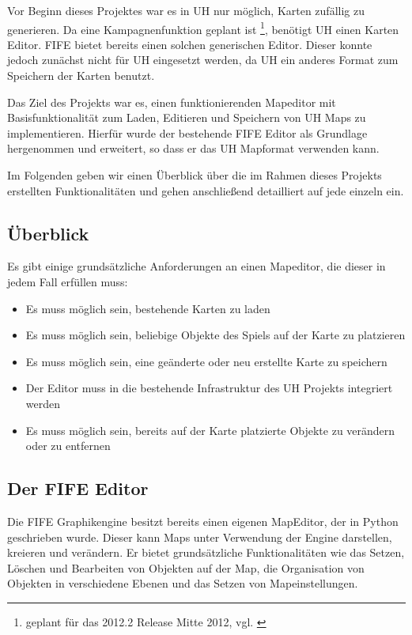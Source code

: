 Vor Beginn dieses Projektes war es in UH nur möglich, Karten zufällig zu
generieren.
Da eine Kampagnenfunktion geplant ist \footnote{geplant für das 2012.2 Release Mitte 2012, vgl.
\cite{roadmap}}, benötigt UH einen Karten Editor. FIFE bietet bereits einen
solchen generischen Editor.
Dieser konnte jedoch zunächst nicht für UH eingesetzt werden, da UH ein
anderes Format zum Speichern der Karten benutzt.

Das Ziel des Projekts war es, einen funktionierenden Mapeditor mit Basisfunktionalität
zum Laden, Editieren und Speichern von UH Maps zu implementieren. Hierfür wurde
der bestehende FIFE Editor als Grundlage hergenommen und erweitert, so dass er das
UH Mapformat verwenden kann.

Im Folgenden geben wir einen Überblick über die im Rahmen dieses Projekts erstellten
Funktionalitäten und gehen anschließend detailliert auf jede einzeln ein.

\subsection{Überblick}
Es gibt einige grundsätzliche Anforderungen an einen Mapeditor, die dieser in jedem
Fall erfüllen muss:

\begin{itemize}
\item Es muss möglich sein, bestehende Karten zu laden
\item Es muss möglich sein, beliebige Objekte des Spiels auf der Karte zu platzieren
\item Es muss möglich sein, eine geänderte oder neu erstellte Karte zu speichern
\item Der Editor muss in die bestehende Infrastruktur des UH Projekts integriert werden
\item Es muss möglich sein, bereits auf der Karte platzierte Objekte zu verändern oder
zu entfernen
\end{itemize}

\subsection{Der FIFE Editor}
Die FIFE Graphikengine besitzt bereits einen eigenen MapEditor, der in Python geschrieben
wurde. Dieser kann Maps unter
Verwendung der Engine darstellen, kreieren und verändern. Er bietet grundsätzliche
Funktionalitäten wie das Setzen, Löschen und Bearbeiten von Objekten auf der
Map, die Organisation von Objekten in verschiedene Ebenen und das Setzen von Mapeinstellungen.

